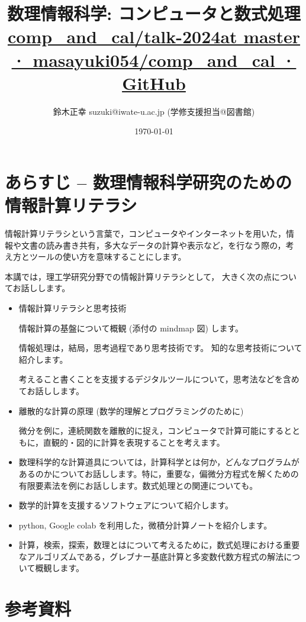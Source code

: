 \documentclass[dvipdfmx,11pat]{jarticle}
\author{鈴木正幸 suzuki@iwate-u.ac.jp (学修支援担当@図書館)}
\date{\today}
\title{ 数理情報科学: コンピュータと数式処理 \href{https://github.com/masayuki054/comp\_and\_cal/tree/master/talk-2024}{comp\_and\_cal/talk-2024at master · masayuki054/comp\_and\_cal · GitHub}}
\begin{document}
\maketitle
\section{あらすじ -- 数理情報科学研究のための情報計算リテラシ}
\label{sec:orgcf4795f}

情報計算リテラシという言葉で，コンピュータやインターネットを用いた，情
報や文書の読み書き共有，多大なデータの計算や表示など，を行なう際の，考
え方とツールの使い方を意味することにします。

本講では，理工学研究分野での情報計算リテラシとして，
大きく次の点についてお話しします。

\begin{itemize}
\item 情報計算リテラシと思考技術

情報計算の基盤について概観 (添付の mindmap 図) します。

情報処理は，結局，思考過程であり思考技術です。
知的な思考技術について紹介します。

考えること書くことを支援するデジタルツールについて，思考法などを含め
てお話しします。

\item 離散的な計算の原理 (数学的理解とプログラミングのために)

微分を例に，連続関数を離散的に捉え，コンピュータで計算可能にするとと
もに，直観的・図的に計算を表現することを考えます。

\item 数理科学的な計算道具については，計算科学とは何か，どんなプログラムが
あるのかについてお話しします。特に，重要な，偏微分方程式を解くための
有限要素法を例にお話しします。数式処理との関連についても。

\item 数学的計算を支援するソフトウェアについて紹介します。

\item python, Google colab を利用した，微積分計算ノートを紹介します。

\item 計算，検索，探索，数理とはについて考えるために，数式処理における重要
なアルゴリズムである，グレブナー基底計算と多変数代数方程式の解法につ
いて概観します。
\end{itemize}
\section{参考資料}
\label{sec:orgddf3c49}
\end{document}
